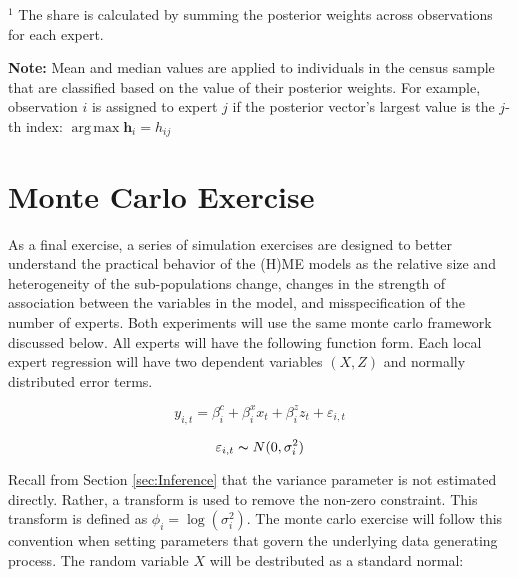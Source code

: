 \documentclass[12pt]{article}
\DeclareMathOperator*{\argmax}{arg\,max}
\theoremstyle{definition}
\begin{document}
\begin{table}
\begin{threeparttable}
        \begin{tablenotes}
          \item{\footnotesize $^{1}$ The share is calculated by summing the 
          posterior weights across observations for each expert.}
          \item{\footnotesize \textbf{Note:} Mean and median values are applied to individuals
          in the census sample that are classified based on the value of their posterior weights.
          For example, observation $i$ is assigned to expert $j$ if the posterior vector's
          largest value is the $j$-th index: $\argmax \boldsymbol{h}_{i} = h_{ij}$}
        \end{tablenotes} \label{tbl:HME3_sample_comparison}
      \end{threeparttable}
    \end{table}
  

\clearpage


\section{Monte Carlo Exercise} \label{sec:MonteCarlo}

As a final exercise, a series of simulation exercises are designed to better
understand the practical behavior of the (H)ME models as the relative size and
heterogeneity of the sub-populations change, changes in the strength of 
association between the variables in the model, and misspecification of the number
of experts. Both experiments will use the same monte carlo framework discussed
below. All experts will have the following function form. Each local expert
regression will have two dependent variables $(X, Z)$ and normally distributed
error terms. 

\begin{equation} \label{eq:MC_regression_eq}
    y_{i,t} = \beta_{i}^{c} + \beta_{i}^{x}  x_{t} + \beta_{i}^{z}  z_{t} + \varepsilon_{i,t}
\end{equation}

\begin{equation} \label{eq:MC_regression_errors}
    \varepsilon_{i,t} \thicksim N(0, \sigma^{2}_{i})
\end{equation}

Recall from Section \ref{sec:Inference} that the variance parameter is not estimated directly. Rather, a transform is used to remove the non-zero constraint. This transform is defined as $\phi_{i} = \log(\sigma^{2}_{i})$. The monte carlo exercise will follow this convention when setting parameters that govern the underlying data generating process. The random variable $X$ will be destributed as a standard normal:
\end{document}
